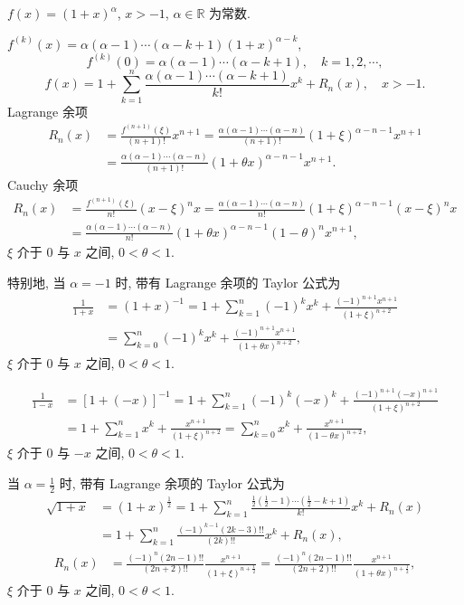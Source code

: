 \begin{example}\label{ex:4.1.6}
$f(x)=(1+x)^{\alpha}$, $x>-1$, $\alpha\in\mathbb{R}$ 为常数.
\end{example}

\begin{solution}
$f^{(k)}(x)=\alpha(\alpha-1)\cdots(\alpha-k+1)(1+x)^{\alpha-k}$,
\[
f^{(k)}(0)=\alpha(\alpha-1)\cdots(\alpha-k+1),\quad k=1,2,\cdots,
\]
\[
f(x)=1+\sum_{k=1}^{n}\frac{\alpha(\alpha-1)\cdots(\alpha-k+1)}{k!}x^{k}+R_{n}(x),\quad x>-1.
\]
Lagrange 余项
\begin{align*}
R_{n}(x)&=\frac{f^{(n+1)}(\xi)}{(n+1)!}x^{n+1}=\frac{\alpha(\alpha-1)\cdots(\alpha-n)}{(n+1)!}(1+\xi)^{\alpha-n-1}x^{n+1}\\
&=\frac{\alpha(\alpha-1)\cdots(\alpha-n)}{(n+1)!}(1+\theta x)^{\alpha-n-1}x^{n+1}.
\end{align*}
Cauchy 余项
\begin{align*}
R_{n}(x)&=\frac{f^{(n+1)}(\xi)}{n!}(x-\xi)^{n}x=\frac{\alpha(\alpha-1)\cdots(\alpha-n)}{n!}(1+\xi)^{\alpha-n-1}(x-\xi)^{n}x\\
&=\frac{\alpha(\alpha-1)\cdots(\alpha-n)}{n!}(1+\theta x)^{\alpha-n-1}(1-\theta)^{n}x^{n+1},
\end{align*}
$\xi$ 介于 $0$ 与 $x$ 之间, $0<\theta<1$.

特别地, 当 $\alpha=-1$ 时, 带有 Lagrange 余项的 Taylor 公式为
\begin{align*}
\frac{1}{1+x}&=(1+x)^{-1}=1+\sum_{k=1}^{n}(-1)^{k}x^{k}+\frac{(-1)^{n+1}x^{n+1}}{(1+\xi)^{n+2}}\\
&=\sum_{k=0}^{n}(-1)^{k}x^{k}+\frac{(-1)^{n+1}x^{n+1}}{(1+\theta x)^{n+2}},
\end{align*}
$\xi$ 介于 $0$ 与 $x$ 之间, $0<\theta<1$.

\begin{align*}
\frac{1}{1-x}&=[1+(-x)]^{-1}=1+\sum_{k=1}^{n}(-1)^{k}(-x)^{k}+\frac{(-1)^{n+1}(-x)^{n+1}}{(1+\xi)^{n+2}}\\
&=1+\sum_{k=1}^{n}x^{k}+\frac{x^{n+1}}{(1+\xi)^{n+2}}=\sum_{k=0}^{n}x^{k}+\frac{x^{n+1}}{(1-\theta x)^{n+2}},
\end{align*}
$\xi$ 介于 $0$ 与 $-x$ 之间, $0<\theta<1$.

当 $\alpha=\frac{1}{2}$ 时, 带有 Lagrange 余项的 Taylor 公式为
\begin{align*}
\sqrt{1+x}&=(1+x)^{\frac{1}{2}}=1+\sum_{k=1}^{n}\frac{\frac{1}{2}\left(\frac{1}{2}-1\right)\cdots\left(\frac{1}{2}-k+1\right)}{k!}x^{k}+R_{n}(x)\\
&=1+\sum_{k=1}^{n}\frac{(-1)^{k-1}(2k-3)!!}{(2k)!!}x^{k}+R_{n}(x),
\end{align*}
\begin{align*}
R_{n}(x)&=\frac{(-1)^{n}(2n-1)!!}{(2n+2)!!}\frac{x^{n+1}}{(1+\xi)^{n+\frac{1}{2}}}=\frac{(-1)^{n}(2n-1)!!}{(2n+2)!!}\frac{x^{n+1}}{(1+\theta x)^{n+\frac{1}{2}}},
\end{align*}
$\xi$ 介于 $0$ 与 $x$ 之间, $0<\theta<1$.
\end{solution}

